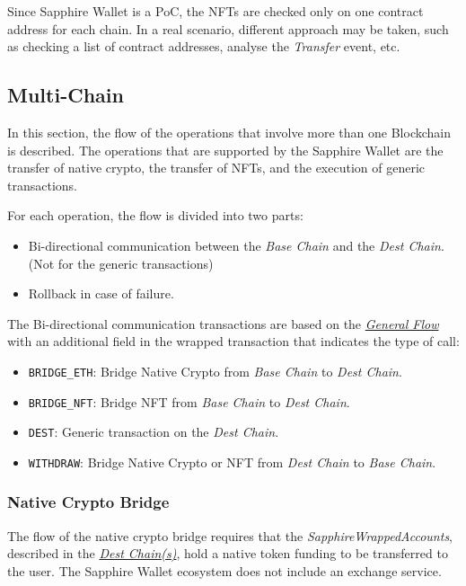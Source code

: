 Since Sapphire Wallet is a PoC, the NFTs are checked only on one contract address for each chain. In a real scenario, different approach may be taken, such as checking a list of contract addresses, analyse the \textit{Transfer} event, etc. 

\subsection{Multi-Chain}

In this section, the flow of the operations that involve more than one Blockchain is described. The operations that are supported by the Sapphire Wallet are the transfer of native crypto, the transfer of NFTs, and the execution of generic transactions.

For each operation, the flow is divided into two parts:
\begin{itemize}
    \item Bi-directional communication between the \textit{Base Chain} and the \textit{Dest Chain}. (Not for the generic transactions)
    \item Rollback in case of failure.
\end{itemize}

The Bi-directional communication transactions are based on the \hyperref[subsubsec:transactionsExecution]{\textit{General Flow}} with an additional field in the wrapped transaction that indicates the type of call:
\begin{itemize}
    \item \texttt{BRIDGE\_ETH}: Bridge Native Crypto from \textit{Base Chain} to \textit{Dest Chain}.
    \item \texttt{BRIDGE\_NFT}: Bridge NFT from \textit{Base Chain} to \textit{Dest Chain}.
    \item \texttt{DEST}: Generic transaction on the \textit{Dest Chain}.
    \item \texttt{WITHDRAW}: Bridge Native Crypto or NFT from \textit{Dest Chain} to \textit{Base Chain}.
\end{itemize}

\subsubsection{Native Crypto Bridge}
\label{subsubsec:native_crypto_bridge}

The flow of the native crypto bridge requires that the \textit{SapphireWrappedAccounts}, described in the \hyperref[subsec:dest_chain(s)]{\textit{Dest Chain(s)}}, hold a native token funding to be transferred to the user. The Sapphire Wallet ecosystem does not include an exchange service.

